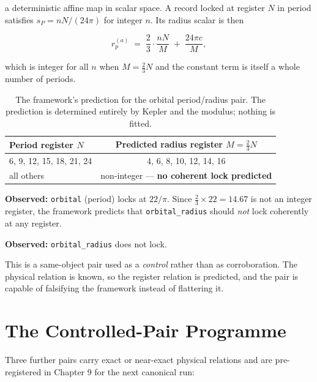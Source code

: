 \documentclass[11pt, letterpaper, openany]{book}
\begin{document}
\noindent a deterministic affine map in scalar space. A record locked at register $N$ in period
satisfies $s_P = n N/(24\pi)$ for integer $n$. Its radius scalar is then

\begin{equation}
r_p^{(a)} \;=\; \frac{2}{3}\cdot\frac{nN}{M} \;+\; \frac{24\pi c}{M},
\end{equation}

\noindent which is integer for all $n$ when $M = \tfrac{2}{3}N$ and the constant term is itself
a whole number of periods.

\begin{table}[H]
\centering
\small
\begin{tabular}{@{}lc@{}}
\toprule
\textbf{Period register $N$} & \textbf{Predicted radius register $M = \tfrac{2}{3}N$} \\
\midrule
6, 9, 12, 15, 18, 21, 24 & 4, 6, 8, 10, 12, 14, 16 \\
all others & non-integer --- \textbf{no coherent lock predicted} \\
\bottomrule
\end{tabular}
\caption{The framework's prediction for the orbital period/radius pair. The prediction is
determined entirely by Kepler and the modulus; nothing is fitted.}
\end{table}

\begin{predictionbox}
\textbf{Observed:} \texttt{orbital} (period) locks at $22/\pi$. Since $\tfrac{2}{3}\times 22 =
14.67$ is not an integer register, the framework predicts that \texttt{orbital\_radius} should
\emph{not} lock coherently at any register.

\medskip
\noindent \textbf{Observed:} \texttt{orbital\_radius} does not lock.
\end{predictionbox}

This is a same-object pair used as a \emph{control} rather than as corroboration. The physical
relation is known, so the register relation is predicted, and the pair is capable of falsifying
the framework instead of flattering it.

\section{The Controlled-Pair Programme}

Three further pairs carry exact or near-exact physical relations and are pre-registered in
Chapter 9 for the next canonical run:
\end{document}
